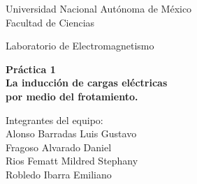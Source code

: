 \documentclass[letterpaper, 11 pt]{article}
\begin{document}
\begin{center}
\vspace*{0.2in}
{\fontsize{21}{21}\selectfont Universidad Nacional Autónoma de México}\\
\vspace*{0.2in}
{\fontsize{18}{18}\selectfont Facultad de Ciencias}\\
\vspace*{0.2in}
\begin{large}
{\fontsize{14}{14}\selectfont Laboratorio de Electromagnetismo} \\
\end{large}
\vspace*{0.2in}
\vspace*{0.2in}
\begin{Large}
\textbf{Práctica 1} \\
\textbf{La inducción de cargas eléctricas \\ por medio del frotamiento.} \\
\end{Large}
\vspace{.7 cm}
Integrantes del equipo:\\
Alonso Barradas Luis Gustavo\\ 
Fragoso Alvarado Daniel\\ 
Rios Fematt Mildred Stephany\\ 
Robledo Ibarra Emiliano\\

\end{center}
\end{document}
